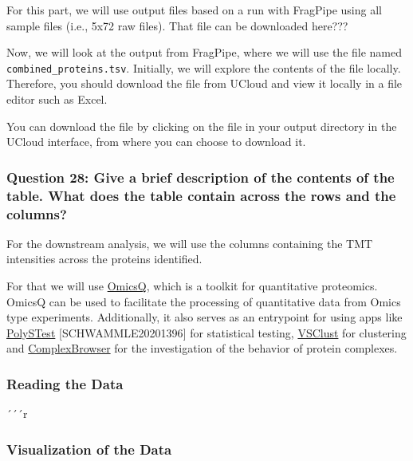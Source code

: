 \documentclass[
  letterpaper,
  DIV=11,
  numbers=noendperiod]{scrartcl}
\begin{document}
For this part, we will use output files based on a run with FragPipe
using all sample files (i.e., 5x72 raw files). That file can be
downloaded here???

Now, we will look at the output from FragPipe, where we will use the
file named \texttt{combined\_proteins.tsv}. Initially, we will explore
the contents of the file locally. Therefore, you should download the
file from UCloud and view it locally in a file editor such as Excel.

You can download the file by clicking on the file in your output
directory in the UCloud interface, from where you can choose to download
it.

\subsubsection{Question 28: Give a brief description of the contents of
the table. What does the table contain across the rows and the
columns?}\label{question-28-give-a-brief-description-of-the-contents-of-the-table.-what-does-the-table-contain-across-the-rows-and-the-columns}

For the downstream analysis, we will use the columns containing the TMT
intensities across the proteins identified.

For that we will use
\href{https://computproteomics.bmb.sdu.dk/app_direct/OmicsQ/}{OmicsQ},
which is a toolkit for quantitative proteomics. OmicsQ can be used to
facilitate the processing of quantitative data from Omics type
experiments. Additionally, it also serves as an entrypoint for using
apps like
\href{https://computproteomics.bmb.sdu.dk/app_direct/PolySTest/}{PolySTest}
{[}SCHWAMMLE20201396{]} for statistical testing,
\href{https://computproteomics.bmb.sdu.dk/app_direct/VSClust/}{VSClust}
for clustering and
\href{https://computproteomics.bmb.sdu.dk/app_direct/ComplexBrowser/}{ComplexBrowser}
for the investigation of the behavior of protein complexes.

\subsubsection{Reading the Data}\label{reading-the-data}

´´´r

\subsubsection{Visualization of the
Data}\label{visualization-of-the-data}
\end{document}
